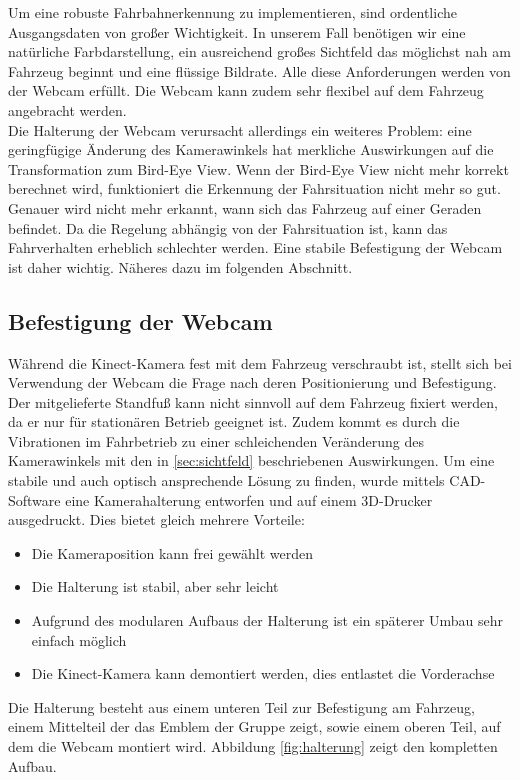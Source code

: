 Um eine robuste Fahrbahnerkennung zu implementieren, sind ordentliche Ausgangsdaten von großer Wichtigkeit.
In unserem Fall benötigen wir eine natürliche Farbdarstellung, ein ausreichend großes Sichtfeld das möglichst nah am Fahrzeug beginnt und eine flüssige Bildrate. 
Alle diese Anforderungen werden von der Webcam erfüllt.
Die Webcam kann zudem sehr flexibel auf dem Fahrzeug angebracht werden.
\\
Die Halterung der Webcam verursacht allerdings ein weiteres Problem: eine geringfügige Änderung des Kamerawinkels hat merkliche Auswirkungen auf die Transformation zum Bird-Eye View.
Wenn der Bird-Eye View nicht mehr korrekt berechnet wird, funktioniert die Erkennung der Fahrsituation nicht mehr so gut.
Genauer wird nicht mehr erkannt, wann sich das Fahrzeug auf einer Geraden befindet.
Da die Regelung abhängig von der Fahrsituation ist, kann das Fahrverhalten erheblich schlechter werden. Eine stabile Befestigung der Webcam ist daher wichtig. Näheres dazu im folgenden Abschnitt.

\subsection{Befestigung der Webcam}
\label{sec:befestigung}
Während die Kinect-Kamera fest mit dem Fahrzeug verschraubt ist, stellt sich bei Verwendung der Webcam die Frage nach deren Positionierung und Befestigung. Der mitgelieferte Standfuß kann nicht sinnvoll auf dem Fahrzeug fixiert werden, da er nur für stationären Betrieb geeignet ist. Zudem kommt es durch die Vibrationen im Fahrbetrieb zu einer schleichenden Veränderung des Kamerawinkels mit den in \ref{sec:sichtfeld} beschriebenen Auswirkungen.
Um eine stabile und auch optisch ansprechende Lösung zu finden, wurde mittels CAD-Software eine Kamerahalterung entworfen und auf einem 3D-Drucker ausgedruckt. Dies bietet gleich mehrere Vorteile:

\begin{itemize}
	\item Die Kameraposition kann frei gewählt werden
	\item Die Halterung ist stabil, aber sehr leicht
	\item Aufgrund des modularen Aufbaus der Halterung ist ein späterer Umbau sehr einfach möglich
	\item Die Kinect-Kamera kann demontiert werden, dies entlastet die Vorderachse
\end{itemize}

Die Halterung besteht aus einem unteren Teil zur Befestigung am Fahrzeug, einem Mittelteil der das Emblem der Gruppe zeigt, sowie einem oberen Teil, auf dem die Webcam montiert wird. Abbildung \ref{fig:halterung} zeigt den kompletten Aufbau.

